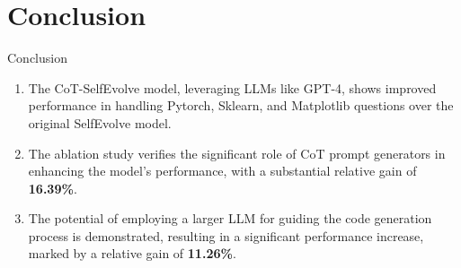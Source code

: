 \section{Conclusion}

\begin{frame}{Conclusion}
    \begin{enumerate}
        \item The CoT-SelfEvolve model, leveraging LLMs like GPT-4, shows improved performance in handling Pytorch, Sklearn, and Matplotlib questions over the original SelfEvolve model.

        \item The ablation study verifies the significant role of CoT prompt generators in enhancing the model's performance, with a substantial relative gain of \textbf{16.39\%}.

        \item The potential of employing a larger LLM for guiding the code generation process is demonstrated, resulting in a significant performance increase, marked by a relative gain of \textbf{11.26\%}.
    \end{enumerate}
\end{frame}

